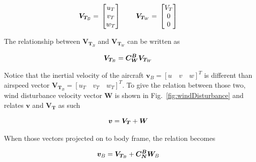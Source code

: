 \begin{equation}{\label{eqn:airspeedComponents}}
\bm{V}_{\bm{T}_B}
=\,
\begin{bmatrix}
u_{T} \\
v_{T}\\
w_{T}\\
\end{bmatrix}
\qquad \,
\bm{V}_{\bm{T}_W}
=\,
\begin{bmatrix}
V_{T} \\
0\\
0\\
\end{bmatrix}
\end{equation}

The relationship between $\bm{V}_{\bm{T}_B}$ and $\bm{V}_{\bm{T}_W}$ can be written as \cite{ducard2009fault}

\begin{equation}{\label{eqn:airspeedVectorTransformation}}
\bm{V}_{\bm{T}_B}=\bm{C_W^B}\bm{V}_{\bm{T}_W}
\end{equation}

Notice that the inertial velocity of the aircraft $\bm{v}_B = {[u \quad v \quad w]}^T$ is different than airspeed vector $\bm{V}_{\bm{T}_B} = {[u_T \quad v_T \quad w_T ]}^T$. 
To give the relation between those two, wind disturbance velocity vector $\bm{W}$ is shown in Fig.~\ref{fig:windDisturbance} and relates $\bm{v}$ and $\bm{V}_{\bm{T}} $ as such 

\begin{equation}{\label{eqn:inertialVelocityAirspeedVectorWind}}
\bm{v}=\bm{V_T} + \bm{W}
\end{equation}

When those vectors projected on to body frame, the relation becomes

\begin{equation}{\label{eqn:inertialVelocityAirspeedVectorWind}}
\bm{v}_B=\bm{V}_{\bm{T}_B} + \bm{C_N^B} \bm{W}_B
\end{equation}

